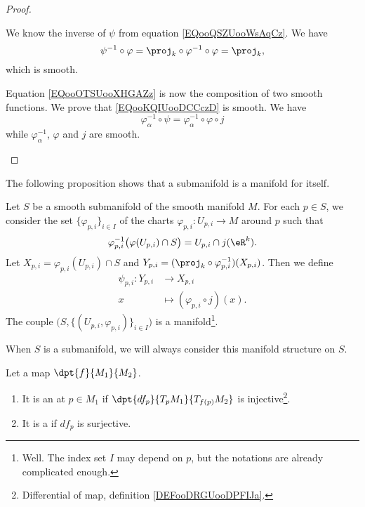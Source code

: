 \begin{proof}
\begin{subproof}
		We know the inverse of \( \psi\) from equation \eqref{EQooQSZUooWsAqCz}. We have
		\begin{equation}
			\psi^{-1}\circ\varphi=\proj_k\circ\varphi^{-1}\circ\varphi=\proj_k,
		\end{equation}
		which is smooth.

		Equation \eqref{EQooOTSUooXHGAZz} is now the composition of two smooth functions.
		We prove that \eqref{EQooKQIUooDCCczD} is smooth. We have
		\begin{equation}
			\varphi_{\alpha}^{-1}\circ\psi=\varphi_{\alpha}^{-1}\circ\varphi\circ j
		\end{equation}
		while \( \varphi_{\alpha}^{-1}\), \( \varphi\) and \( j\) are smooth.
	\end{subproof}
\end{proof}

The following proposition shows that a submanifold is a manifold for itself.
\begin{proposition}      \label{PROPooRZIHooXIhnpq}
	Let \( S\) be a smooth submanifold of the smooth manifold \( M\). For each \( p\in S\), we consider the set \( \{ \varphi_{p,i} \}_{i\in I}\) of the charts \( \varphi_{p,i}\colon U_{p,i}\to M\) around \( p\) such that
	\begin{equation}
		\varphi_{p,i}^{-1}\big( \varphi(U_{p,i})\cap S \big)=U_{p,i}\cap j(\eR^k).
	\end{equation}
	Let \( X_{p,i}=\varphi_{p,i}(U_{p,i})\cap S\) and \( Y_{p,i}=(\proj_k\circ\varphi_{p,i}^{-1})(X_{p,i})\). Then we define
	\begin{equation}
		\begin{aligned}
			\psi_{p,i}\colon Y_{p,i} & \to X_{p,i}                        \\
			x                        & \mapsto (\varphi_{p,i}\circ j)(x).
		\end{aligned}
	\end{equation}
	The couple \( \big( S,\{ (U_{p,i},\varphi_{p,i}) \}_{i\in I} \big)\) is a manifold\footnote{Well. The index set \( I\) may depend on \( p\), but the notations are already complicated enough.}.

	When \( S\) is a submanifold, we will always consider this manifold structure on \( S\).
\end{proposition}

\begin{definition}      \label{DEFooZKUIooXWVGvh}
	Let a map $\dpt{f}{M_1}{M_2}$.
	\begin{enumerate}
		\item
		      It is an  at $p\in M_1$ if $\dpt{df_p}{T_pM_1}{T_{f(p)}M_2}$ is injective\footnote{Differential of map, definition \ref{DEFooDRGUooDPFIJa}.}.
		\item
		      It is a  if $df_p$ is surjective.
	\end{enumerate}
\end{definition}

